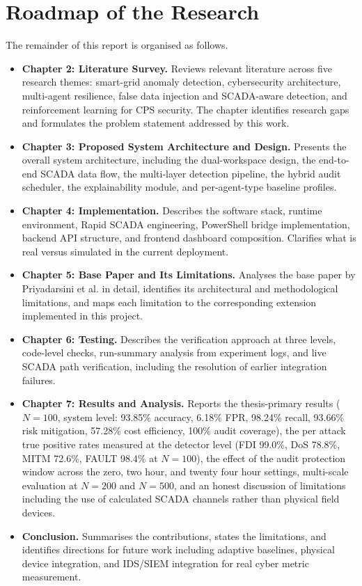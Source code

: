 \section{Roadmap of the Research}

The remainder of this report is organised as follows.

\begin{itemize}
    \item \textbf{Chapter 2: Literature Survey.} Reviews relevant literature across five research themes: smart-grid anomaly detection, cybersecurity architecture, multi-agent resilience, false data injection and SCADA-aware detection, and reinforcement learning for CPS security. The chapter identifies research gaps and formulates the problem statement addressed by this work.

    \item \textbf{Chapter 3: Proposed System Architecture and Design.} Presents the overall system architecture, including the dual-workspace design, the end-to-end SCADA data flow, the multi-layer detection pipeline, the hybrid audit scheduler, the explainability module, and per-agent-type baseline profiles.

    \item \textbf{Chapter 4: Implementation.} Describes the software stack, runtime environment, Rapid SCADA engineering, PowerShell bridge implementation, backend API structure, and frontend dashboard composition. Clarifies what is real versus simulated in the current deployment.

    \item \textbf{Chapter 5: Base Paper and Its Limitations.} Analyses the base paper by Priyadarsini et al. \cite{priyadarsini2025enhancing} in detail, identifies its architectural and methodological limitations, and maps each limitation to the corresponding extension implemented in this project.

    \item \textbf{Chapter 6: Testing.} Describes the verification approach at three levels, code-level checks, run-summary analysis from experiment logs, and live SCADA path verification, including the resolution of earlier integration failures.

    \item \textbf{Chapter 7: Results and Analysis.} Reports the thesis-primary results ($N = 100$, system level: 93.85\% accuracy, 6.18\% FPR, 98.24\% recall, 93.66\% risk mitigation, 57.28\% cost efficiency, 100\% audit coverage), the per attack true positive rates measured at the detector level (FDI 99.0\%, DoS 78.8\%, MITM 72.6\%, FAULT 98.4\% at $N=100$), the effect of the audit protection window across the zero, two hour, and twenty four hour settings, multi-scale evaluation at $N = 200$ and $N = 500$, and an honest discussion of limitations including the use of calculated SCADA channels rather than physical field devices.

    \item \textbf{Conclusion.} Summarises the contributions, states the limitations, and identifies directions for future work including adaptive baselines, physical device integration, and IDS/SIEM integration for real cyber metric measurement.
\end{itemize}

